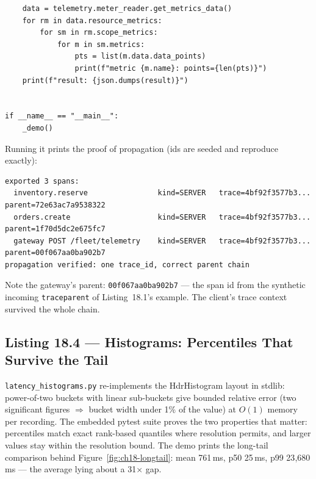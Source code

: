 \begin{verbatim}
    data = telemetry.meter_reader.get_metrics_data()
    for rm in data.resource_metrics:
        for sm in rm.scope_metrics:
            for m in sm.metrics:
                pts = list(m.data.data_points)
                print(f"metric {m.name}: points={len(pts)}")
    print(f"result: {json.dumps(result)}")


if __name__ == "__main__":
    _demo()
\end{verbatim}

\noindent Running it prints the proof of propagation (ids are seeded and
reproduce exactly):

\begin{verbatim}
exported 3 spans:
  inventory.reserve                kind=SERVER   trace=4bf92f3577b3... parent=72e63ac7a9538322
  orders.create                    kind=SERVER   trace=4bf92f3577b3... parent=1f70d5dc2e675fc7
  gateway POST /fleet/telemetry    kind=SERVER   trace=4bf92f3577b3... parent=00f067aa0ba902b7
propagation verified: one trace_id, correct parent chain
\end{verbatim}

Note the gateway's parent: \texttt{00f067aa0ba902b7} --- the span id from
the synthetic incoming \texttt{traceparent} of Listing~18.1's example. The
client's trace context survived the whole chain.

\subsection{Listing 18.4 --- Histograms: Percentiles That Survive the Tail}
\label{subsec:ch18-listing-histogram}

\texttt{latency\_histograms.py} re-implements the HdrHistogram layout in
stdlib: power-of-two buckets with linear sub-buckets give bounded relative
error (two significant figures $\Rightarrow$ bucket width under 1\% of the
value) at $O(1)$ memory per recording. The embedded pytest suite proves the
two properties that matter: percentiles match exact rank-based quantiles
where resolution permits, and larger values stay within the resolution
bound. The demo prints the long-tail comparison behind
Figure~\ref{fig:ch18-longtail}: mean 761\,ms, p50 25\,ms, p99 23{,}680\,ms
--- the average lying about a 31$\times$ gap.

